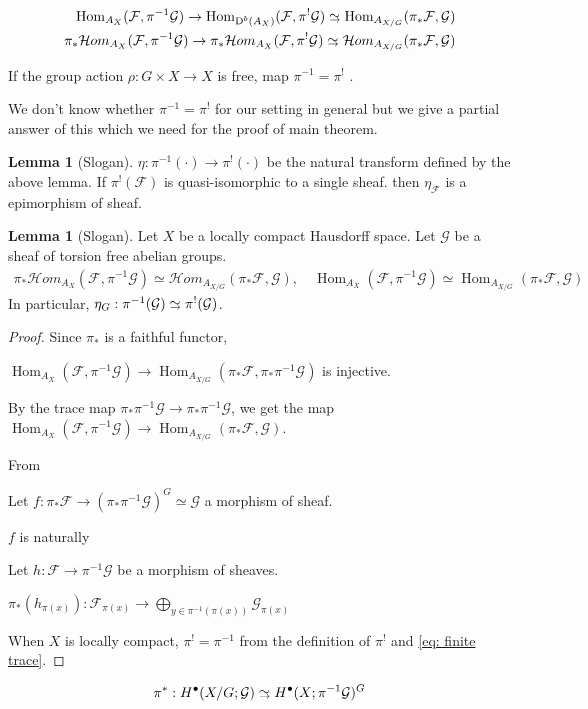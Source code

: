\documentclass[a4paper,dvipdfmx,reqno,12pt]{amsart}
\theoremstyle{definition}
\newtheorem{Lem}[Thm]{Lemma}
\newcommand{\mcal}[1]{\mathcal{#1}}%
\newcommand{\opn}[1]{\operatorname{#1}}
\newcommand{\simto}{ 
\mathrel{\raisebox{0.13em}{${\sim}$}}
\kern -0.75em \mathrel{\raisebox{-0.11em}{${\scriptstyle \to}$}}  
}
\numberwithin{equation}{section}
\begin{document}
\begin{align}
  \opn{Hom}_{A_X}(\mcal{F},\pi^{-1}\mcal{G})\to
  \opn{Hom}_{\opn{D}^{b}(A_X)}(\mcal{F},\pi^{!}\mcal{G}) \simto
  \opn{Hom}_{A_{X/G}}(\pi_*\mcal{F},\mcal{G}) \\
  \pi_*\mcal{H}om_{A_{X}}(\mcal{F},\pi^{-1}\mcal{G}) \to
  \pi_*\mcal{H}om_{A_{X}}(\mcal{F},\pi^{!}\mcal{G})\simto
  \mcal{H}om_{A_{X/G}}(\pi_*\mcal{F},\mcal{G})
\end{align}

If the group action $\rho:G \times X \to X$ is free,
map
$\pi^{-1}=\pi^{!}$ \cite[VII.(4.5),(4.6)]{iversenCohomologySheaves1986a}.



We don't know whether $\pi^{-1}=\pi^{!}$ for our setting in general but
we give a partial answer of this which we need for the proof of main
theorem.

\begin{Lem}[Slogan]
  $\eta:\pi^{-1}(\cdot)\to \pi^{!}(\cdot)$ be the natural transform
  defined by the above lemma.
  If $\pi^{!}(\mcal{F})$ is quasi-isomorphic to a single sheaf.
  then $\eta_{\mcal{F}}$ is a epimorphism of sheaf.
\end{Lem}

\begin{Lem}[Slogan]
  Let $X$ be a locally compact Hausdorff space. Let $\mcal{G}$ be a sheaf of
  torsion free abelian groups.
  \begin{align} \label{eq: finite trace}
    \pi_*\mcal{H}om_{A_{X}}(\mcal{F},\pi^{-1}\mcal{G})\simeq
    \mcal{H}om_{A_{X/G}}(\pi_*\mcal{F},\mcal{G}), \quad
    \opn{Hom}_{A_{X}}(\mcal{F},\pi^{-1}\mcal{G})\simeq
    \opn{Hom}_{A_{X/G}}(\pi_*\mcal{F},\mcal{G})
  \end{align}
  In particular, $\eta_{G}:\pi^{-1}(\mcal{G})\simto \pi^{!}(\mcal{G})$.
\end{Lem}
\begin{proof}
  Since $\pi_*$ is a faithful functor,

  $\opn{Hom}_{A_{X}}(\mcal{F},\pi^{-1}\mcal{G})
    \to \opn{Hom}_{A_{X/G}}(\pi_*\mcal{F},\pi_*\pi^{-1}\mcal{G})$
  is injective.

  By the trace map $\pi_*\pi^{-1}\mcal{G}\to \pi_*\pi^{-1}\mcal{G}$,
  we get the map
  $\opn{Hom}_{A_{X}}(\mcal{F},\pi^{-1}\mcal{G})
    \to \opn{Hom}_{A_{X/G}}(\pi_*\mcal{F},\mcal{G})$.

  From

  Let $f:\pi_*\mcal{F}\to (\pi_*\pi^{-1}\mcal{G})^{G}\simeq \mcal{G}$ a morphism of sheaf.

  $f$ is naturally

  Let $h:\mcal{F}\to \pi^{-1}\mcal{G}$ be a morphism of sheaves.

  $\pi_*(h_{\pi(x)}): \mcal{F}_{\pi(x)}\to \bigoplus_{y\in \pi^{-1}(\pi(x))}\mcal{G}_{\pi(x)}$

  When $X$ is locally compact,
  $\pi^{!}=\pi^{-1}$ from the definition of $\pi^{!}$ and \cref{eq: finite trace}.
\end{proof}
\cite[Theorem 19.2]{bredonSheafTheory1997a}
\begin{align}
  \pi^{*}: H^{\bullet}(X/G;\mcal{G})\simto  H^{\bullet}(X;\pi^{-1}\mcal{G})^{G}
\end{align}
\end{document}
